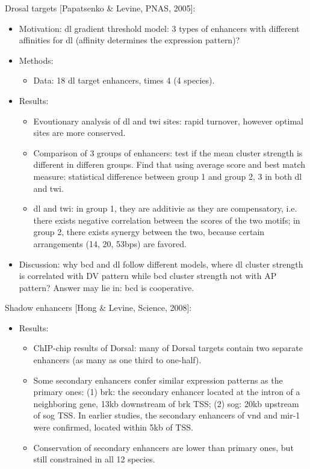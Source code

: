 \documentclass{report}
\begin{document}
\begin{enumerate}
	Drosal targets [Papatsenko \& Levine, PNAS, 2005]:
	\begin{itemize}
		\item Motivation: dl gradient threshold model: 3 types of enhancers with different affinities for dl (affinity determines the expression pattern)? 
		
		\item Methods:
		\begin{itemize}
			\item Data: 18 dl target enhancers, times 4 (4 species). 
		\end{itemize}
		
		\item Results:
		\begin{itemize}
			\item Evoutionary analysis of dl and twi sites: rapid turnover, however optimal sites are more conserved. 
			\item Comparison of 3 groups of enhancers: test if the mean cluster strength is different in differen groups. Find that using average score and best match measure: statistical difference between group 1 and group 2, 3 in both dl and twi. 
			\item dl and twi: in group 1, they are additivie as they are compensatory, i.e. there exists negative correlation between the scores of the two motifs; in group 2, there exists synergy between the two, because certain arrangements (14, 20, 53bps) are favored. 
		\end{itemize}
		
		\item Discussion: why bcd and dl follow different models, where dl cluster strength is correlated with DV pattern while bcd cluster strength not with AP pattern? Answer may lie in: bcd is cooperative. 
	\end{itemize}
	
	Shadow enhancers [Hong \& Levine, Science, 2008]:
	\begin{itemize}
		\item Results: 
		\begin{itemize}
			\item ChIP-chip results of Dorsal: many of Dorsal targets contain two separate enhancers (as many as one third to one-half). 
			\item Some secondary enhancers confer similar expression patterns as the primary ones: (1) brk: the secondary enhancer located at the intron of a neighboring gene, 13kb downstream of brk TSS; (2) sog: 20kb upstream of sog TSS. In earlier studies, the secondary enhancers of vnd and mir-1 were confirmed, located within 5kb of TSS. 
			\item Conservation of secondary enhancers are lower than primary ones, but still constrained in all 12 species. 
		\end{itemize}
		

\end{itemize}
\end{enumerate}
\end{document}
